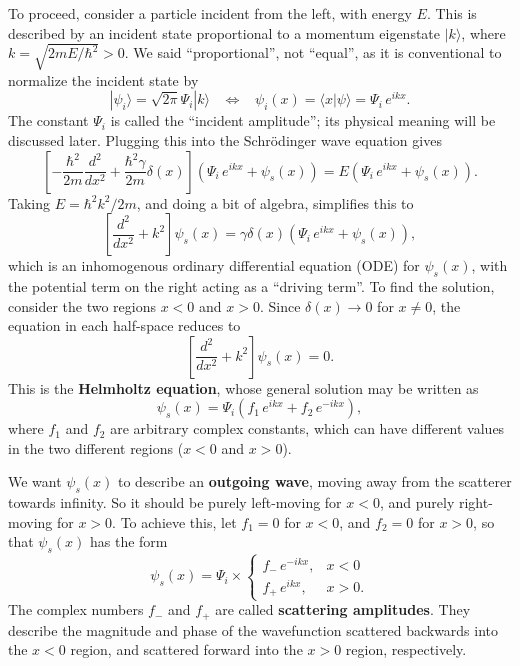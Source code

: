 \documentclass[pra,12pt]{revtex4}
\begin{document}
To proceed, consider a particle incident from the left, with energy
$E$.  This is described by an incident state proportional to a
momentum eigenstate $|k\rangle$, where $k = \sqrt{2mE/\hbar^2} > 0$.
We said ``proportional'', not ``equal'', as it is conventional to
normalize the incident state by
\begin{equation}
  |\psi_i\rangle = \sqrt{2\pi}\Psi_i |k\rangle \;\;\; \Leftrightarrow\;\;\; \psi_i(x) = \langle x|\psi\rangle = \Psi_i \, e^{ik x}.
\end{equation}
The constant $\Psi_i$ is called the ``incident amplitude''; its
physical meaning will be discussed later.  Plugging this into the
Schr\"odinger wave equation gives
\begin{equation}
  \left[-\frac{\hbar^2}{2m} \frac{d^2}{dx^2} + \frac{\hbar^2\gamma}{2m}\delta(x)\right] \left(\Psi_i \, e^{ikx} + \psi_s(x) \right) = E \left(\Psi_i \, e^{ikx} + \psi_s(x) \right).
\end{equation}
Taking $E = \hbar^2k^2/2m$, and doing a bit of algebra, simplifies this to
\begin{equation}
  \left[ \frac{d^2}{dx^2} + k^2\right] \psi_s(x) =  \gamma \delta(x) \left(\Psi_i \, e^{ikx} + \psi_s(x) \right),
\end{equation}
which is an inhomogenous ordinary differential equation (ODE) for
$\psi_s(x)$, with the potential term on the right acting as a
``driving term''.  To find the solution, consider the two regions $x <
0$ and $x > 0$.  Since $\delta(x) \rightarrow 0$ for $x \ne 0$, the
equation in each half-space reduces to
\begin{equation}
  \left[\frac{d^2}{dx^2} + k^2\right] \psi_s(x) = 0.
\end{equation}
This is the \textbf{Helmholtz equation}, whose general solution may be
written as
\begin{equation}
  \psi_s(x) = \Psi_i \left(f_1 \, e^{ik x} + f_2 \, e^{-ik x}\right),
\end{equation}
where $f_1$ and $f_2$ are arbitrary complex constants, which can have
different values in the two different regions ($x < 0$ and $x > 0$).

We want $\psi_s(x)$ to describe an \textbf{outgoing wave}, moving away
from the scatterer towards infinity.  So it should be purely
left-moving for $x < 0$, and purely right-moving for $x > 0$.  To
achieve this, let $f_1 = 0$ for $x < 0$, and $f_2 = 0$ for $x > 0$, so
that $\psi_s(x)$ has the form
\begin{equation}
  \psi_s(x) = \Psi_i \times \begin{cases}f_- \,e^{-ikx}, & x < 0 \\ f_+ \,e^{ikx}, & x > 0.\end{cases}
\end{equation}
The complex numbers $f_-$ and $f_+$ are called \textbf{scattering
  amplitudes}.  They describe the magnitude and phase of the
wavefunction scattered backwards into the $x<0$ region, and scattered
forward into the $x > 0$ region, respectively.
\end{document}
